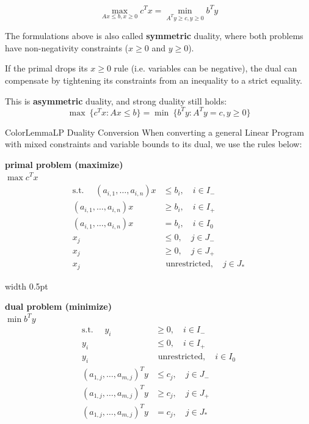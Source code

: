 \documentclass[a4paper, 11pt]{report}
\begin{document}
\colorbox{ForestGreen!7}{\parbox{\linewidth}{$$\max_{Ax \le b, x \ge 0} c^T x = \min_{A^T y \ge c, y \ge 0} b^T y$$}}

The formulations above is also called \textbf{symmetric} duality, where both problems have non-negativity constraints ($x \ge 0$ and $y \ge 0$). 

If the primal drops its $x \ge 0$ rule (i.e. variables can be negative), the dual can compensate by tightening its constraints from an inequality to a strict equality. 

This is \textbf{asymmetric} duality, and strong duality still holds:
$$ \max \ \{c^T x : Ax \le b\} = \min \ \{b^T y : A^T y = c, y \ge 0\} $$

\begin{cframe}{ColorLemma}{LP Duality Conversion}{}
When converting a general Linear Program with mixed constraints and variable bounds to its dual, we use the rules below:

\vspace{3mm}
\noindent
\begin{minipage}[t]{0.47\textwidth}
    \centering
    \textbf{primal problem (maximize)}\\[1mm]
    $\max c^T x$
    \begin{align*}
        \text{s.t. } \quad 
        (a_{i,1}, \dots, a_{i,n})x &\le b_i, \quad i \in I_- \\
        (a_{i,1}, \dots, a_{i,n})x &\ge b_i, \quad i \in I_+ \\
        (a_{i,1}, \dots, a_{i,n})x &= b_i, \quad i \in I_0 \\[2mm]
        x_j &\le 0, \quad j \in J_- \\
        x_j &\ge 0, \quad j \in J_+ \\
        x_j &\text{ unrestricted}, \quad j \in J_*
    \end{align*}
\end{minipage}%
\hfill
\vrule width 0.5pt
\hfill
\begin{minipage}[t]{0.47\textwidth}
    \centering
    \textbf{dual problem (minimize)}\\[1mm]
    $\min b^T y$
    \begin{align*}
        \text{s.t. } \quad 
        y_i &\ge 0, \quad i \in I_- \\
        y_i &\le 0, \quad i \in I_+ \\
        y_i &\text{ unrestricted}, \quad i \in I_0 \\[2mm]
        (a_{1,j}, \dots, a_{m,j})^T y &\le c_j, \quad j \in J_- \\
        (a_{1,j}, \dots, a_{m,j})^T y &\ge c_j, \quad j \in J_+ \\
        (a_{1,j}, \dots, a_{m,j})^T y &= c_j, \quad j \in J_*
    \end{align*}
\end{minipage}


\end{cframe}
\end{document}
